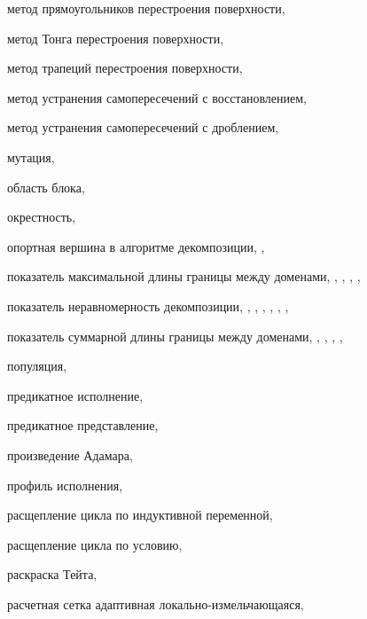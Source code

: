 метод прямоугольников перестроения поверхности, \pageref{term:method_remesh_rect}

метод Тонга перестроения поверхности, \pageref{term:method_remesh_tong}

метод трапеций перестроения поверхности, \pageref{term:method_remesh_trap}

метод устранения самопересечений с восстановлением, \pageref{term:method_selfint_repare}

метод устранения самопересечений с дроблением, \pageref{term:method_selfint_cut}

мутация, \pageref{term:mutation}

область блока, \pageref{term:block_scope}

окрестность, \pageref{term:okrestnost}

опортная вершина в алгоритме декомпозиции, \pageref{term:opor_point}, \pageref{term:opor_point2}

показатель максимальной длины границы между доменами, \pageref{term:decomp_maxbord}, \pageref{term:decomp_maxbord2}, \pageref{term:decomp_maxbord3}, \pageref{term:decomp_maxbord4}, \pageref{term:decomp_maxbord5}

показатель неравномерность декомпозиции, \pageref{term:decomp_neravn}, \pageref{term:decomp_neravn2}, \pageref{term:decomp_neravn3}, \pageref{term:decomp_neravn4}, \pageref{term:decomp_neravn5}, \pageref{term:decomp_neravn6}, \pageref{term:decomp_neravn7}

показатель суммарной длины границы между доменами, \pageref{term:decomp_sumbord}, \pageref{term:decomp_sumbord2}, \pageref{term:decomp_sumbord3}, \pageref{term:decomp_sumbord4}, \pageref{term:decomp_sumbord5}

популяция, \pageref{term:population}

предикатное исполнение, \pageref{term:predicate_execution}

предикатное представление, \pageref{term:predicate_view}

произведение Адамара, \pageref{term:hadamar_mul}

профиль исполнения, \pageref{term:execution_profile}

расщепление цикла по индуктивной переменной, \pageref{term:loop_split_by_inductive}

расщепление цикла по условию, \pageref{term:loop_split_by_cond}

раскраска Тейта, \pageref{term:coloring_tait}

расчетная сетка адаптивная локально-измельчающаяся, \pageref{term:mesh_adaptive}

